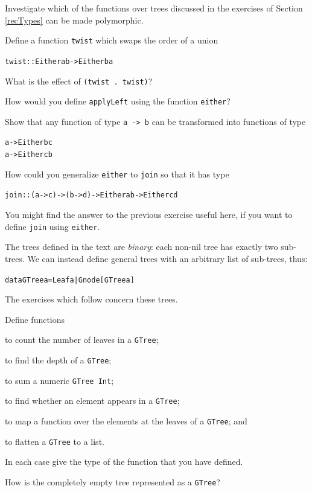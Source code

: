 \begin{exercises}

\item
Investigate which of the functions over trees discussed in the exercises of
Section \ref{recTypes} can be made polymorphic.

\item
Define a function \texttt{twist} which swaps the order of a union
\begin{alltt}
twist :: Either a b -> Either b a
\end{alltt}
What is the effect of \texttt{(twist .\ twist)}?

\item
How would you define \texttt{applyLeft} using the function
\texttt{either}?

\item
Show that any function of type \texttt{a -> b} can be transformed into
functions of type
\begin{alltt}
a -> Either b c
a -> Either c b
\end{alltt}

\item
How could you generalize \texttt{either} to \texttt{join} so that it has type
\begin{alltt}
join :: (a -> c) -> (b -> d) -> Either a b -> Either c d
\end{alltt}
You might find the answer to the previous exercise useful here, if you want
to define \texttt{join} using \texttt{either}.
\end{exercises}

\medskip\noindent
The trees defined in the text are {\em binary}: each non-nil
tree has exactly two
sub-trees. We can instead define general
trees with an arbitrary list of sub-trees,
thus:
\begin{alltt}
data GTree a = Leaf a | Gnode [GTree a]
\end{alltt}
The exercises which follow concern these trees.

\begin{exercises}
\item
Define functions 
\begin{titemize} 
\item to count the number of leaves in a \texttt{GTree}; 
\item to find
the depth of a \texttt{GTree}; 
\item to sum a numeric \texttt{GTree Int}; 
\item to find whether
an element appears in a \texttt{GTree}; 
\item to map a function over the elements at
the leaves of a \texttt{GTree}; and 
\item to flatten a \texttt{GTree} to a list.
\end{titemize}
In each case give the type of the function that you have defined.
\item
How is the completely empty tree represented as a \texttt{GTree}?

\end{exercises}
